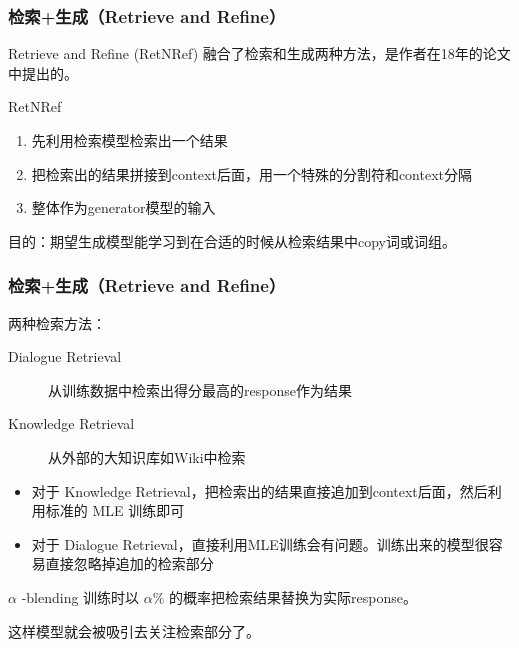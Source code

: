 \documentclass{beamer}
\begin{document}
\begin{frame}
    \frametitle{检索+生成（Retrieve and Refine）}

    Retrieve and Refine (RetNRef) 融合了检索和生成两种方法，是作者在18年的论文中提出的。

    \begin{block}{RetNRef}
        \begin{enumerate}
            \item 先利用检索模型检索出一个结果
            \item 把检索出的结果拼接到context后面，用一个特殊的分割符和context分隔
            \item 整体作为generator模型的输入
        \end{enumerate}
    \end{block}

    目的：期望生成模型能学习到在合适的时候从检索结果中copy词或词组。
\end{frame}

\begin{frame}
    \frametitle{检索+生成（Retrieve and Refine）}

    两种检索方法：

    \begin{description}
        \item[Dialogue Retrieval] 从训练数据中检索出得分最高的response作为结果
        \item[Knowledge Retrieval] 从外部的大知识库如Wiki中检索
    \end{description}

    \begin{itemize}
        \item 对于 Knowledge Retrieval，把检索出的结果直接追加到context后面，然后利用标准的 MLE 训练即可
        \item 对于 Dialogue Retrieval，直接利用MLE训练会有问题。训练出来的模型很容易直接忽略掉追加的检索部分
    \end{itemize}

    \begin{block}{$\alpha$ -blending}
        训练时以 $\alpha \%$ 的概率把检索结果替换为实际response。

        这样模型就会被吸引去关注检索部分了。
    \end{block}
\end{frame}
\end{document}
